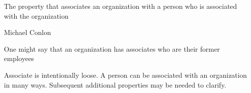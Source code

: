 \documentclass[letterpaper,10pt,english]{sphinxmanual}
\begin{document}
\begin{sphinxShadowBox}

\sphinxAtStartPar
{}
\end{sphinxShadowBox}

\begin{sphinxShadowBox}

\sphinxAtStartPar
The property that associates an organization with a person who is associated with the organization
\end{sphinxShadowBox}

\begin{sphinxShadowBox}

\sphinxAtStartPar
Michael Conlon 
\end{sphinxShadowBox}

\begin{sphinxShadowBox}

\sphinxAtStartPar
{\hyperref[\detokenize{doc-ORG_0000001::doc}]{}}
\end{sphinxShadowBox}

\begin{sphinxShadowBox}

\sphinxAtStartPar
{\hyperref[\detokenize{doc-NCBITaxon_9606::doc}]{}}
\end{sphinxShadowBox}

\begin{sphinxShadowBox}

\sphinxAtStartPar
{\hyperref[\detokenize{doc-ORG_2000019::doc}]{}}
\end{sphinxShadowBox}

\begin{sphinxShadowBox}

\sphinxAtStartPar
One might say that an organization has associates who are their former employees
\end{sphinxShadowBox}

\begin{sphinxShadowBox}

\sphinxAtStartPar
Associate is intentionally loose.  A person can be associated with an organization in many ways.  Subsequent additional properties may be needed to clarify.
\end{sphinxShadowBox}
\end{document}
